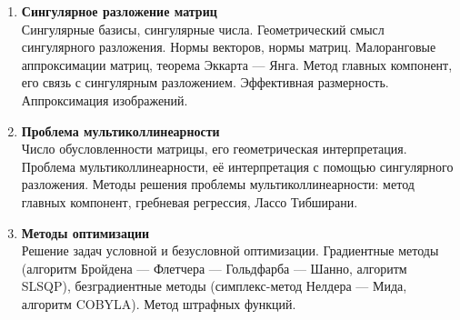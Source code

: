\documentclass[12pt,oneside,openany]{article}
\begin{document}
\begin{enumerate}
  \item \textbf{Сингулярное разложение матриц} \\
  Сингулярные базисы, сингулярные числа. Геометрический смысл сингулярного разложения. Нормы векторов, нормы матриц. Малоранговые аппроксимации матриц, теорема Эккарта --- Янга. Метод главных компонент, его связь с сингулярным разложением. Эффективная размерность. Аппроксимация изображений.

  \item \textbf{Проблема мультиколлинеарности} \\
  Число обусловленности матрицы, его геометрическая интерпретация. Проблема мультиколлинеарности, её интерпретация с помощью сингулярного разложения. Методы решения проблемы мультиколлинеарности: метод главных компонент, гребневая регрессия, Лассо Тибширани.

  \item \textbf{Методы оптимизации} \\
  Решение задач условной и безусловной оптимизации. Градиентные методы (алгоритм Бройдена --- Флетчера --- Гольдфарба --- Шанно, алгоритм SLSQP), безградиентные методы (симплекс-метод Нелдера --- Мида, алгоритм COBYLA). Метод штрафных функций.

\end{enumerate}
\end{document}
